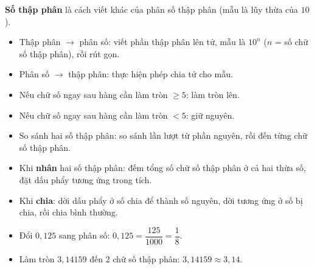 \documentclass[12pt,a4paper]{article}
\begin{document}
\begin{dinhnghia}
\textbf{Số thập phân} là cách viết khác của phân số thập phân (mẫu là lũy thừa của $10$).
\end{dinhnghia}

\begin{phuongphap}[title={Đổi số thập phân $\leftrightarrow$ phân số}]
\begin{itemize}
  \item Thập phân $\to$ phân số: viết phần thập phân lên tử, mẫu là $10^n$ ($n$ = số chữ số thập phân), rồi rút gọn.
  \item Phân số $\to$ thập phân: thực hiện phép chia tử cho mẫu.
\end{itemize}
\end{phuongphap}

\begin{phuongphap}[title={Quy tắc làm tròn số}]
\begin{itemize}
  \item Nếu chữ số ngay sau hàng cần làm tròn $\ge 5$: làm tròn lên.
  \item Nếu chữ số ngay sau hàng cần làm tròn $< 5$: giữ nguyên.
\end{itemize}
\end{phuongphap}

\begin{luuy}
\begin{itemize}
  \item So sánh hai số thập phân: so sánh lần lượt từ phần nguyên, rồi đến từng chữ số thập phân.
  \item Khi \textbf{nhân} hai số thập phân: đếm tổng số chữ số thập phân ở cả hai thừa số, đặt dấu phẩy tương ứng trong tích.
  \item Khi \textbf{chia}: dời dấu phẩy ở số chia để thành số nguyên, dời tương ứng ở số bị chia, rồi chia bình thường.
\end{itemize}
\end{luuy}

\begin{vidu}
\begin{itemize}
  \item Đổi $0{,}125$ sang phân số: $0{,}125 = \dfrac{125}{1000} = \dfrac{1}{8}$.
  \item Làm tròn $3{,}14159$ đến 2 chữ số thập phân: $3{,}14159 \approx 3{,}14$.
\end{itemize}
\end{vidu}

\end{document}

